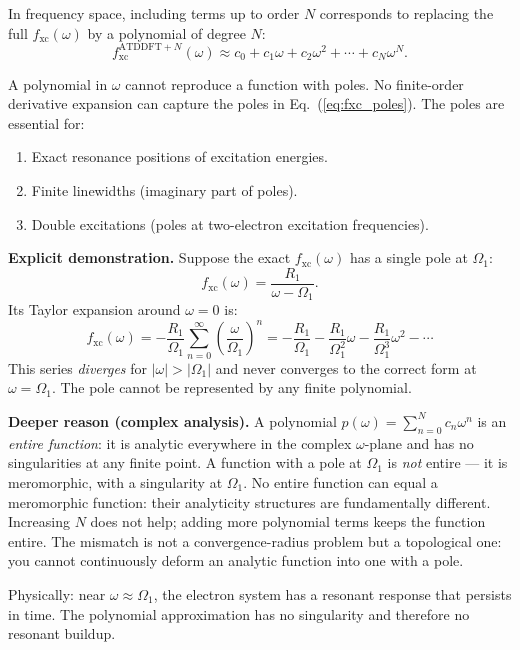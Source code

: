 \documentclass[12pt,letterpaper]{article}
\newcommand{\fxc}{f_{\mathrm{xc}}}
\theoremstyle{definition}
\begin{document}
In frequency space, including terms up to order $N$ corresponds to
replacing the full $\fxc(\omega)$ by a polynomial of degree $N$:
\begin{equation}
  \fxc^{\mathrm{ATDDFT}+N}(\omega)
  \approx c_0 + c_1\omega + c_2\omega^2 + \cdots + c_N\omega^N.
  \label{eq:polynomial}
\end{equation}

\begin{keyresult}
A polynomial in $\omega$ cannot reproduce a function with poles.
No finite-order derivative expansion can capture the poles in
Eq.~(\ref{eq:fxc_poles}).  The poles are essential for:
\begin{enumerate}[noitemsep]
  \item Exact resonance positions of excitation energies.
  \item Finite linewidths (imaginary part of poles).
  \item Double excitations (poles at two-electron excitation frequencies).
\end{enumerate}
\end{keyresult}

\begin{derivbox}
\textbf{Explicit demonstration.}
Suppose the exact $\fxc(\omega)$ has a single pole at $\Omega_1$:
\[
  \fxc(\omega) = \frac{R_1}{\omega - \Omega_1}.
\]
Its Taylor expansion around $\omega=0$ is:
\[
  \fxc(\omega) = -\frac{R_1}{\Omega_1}\sum_{n=0}^\infty
  \left(\frac{\omega}{\Omega_1}\right)^n
  = -\frac{R_1}{\Omega_1} - \frac{R_1}{\Omega_1^2}\omega
  - \frac{R_1}{\Omega_1^3}\omega^2 - \cdots
\]
This series \emph{diverges} for $|\omega|>|\Omega_1|$ and never
converges to the correct form at $\omega=\Omega_1$.  The pole cannot
be represented by any finite polynomial.

\textbf{Deeper reason (complex analysis).}
A polynomial $p(\omega) = \sum_{n=0}^N c_n\omega^n$ is an \emph{entire
function}: it is analytic everywhere in the complex $\omega$-plane and
has no singularities at any finite point.
A function with a pole at $\Omega_1$ is \emph{not} entire --- it is
meromorphic, with a singularity at $\Omega_1$.
No entire function can equal a meromorphic function:
their analyticity structures are fundamentally different.
Increasing $N$ does not help; adding more polynomial terms keeps the
function entire.  The mismatch is not a convergence-radius problem but
a topological one: you cannot continuously deform an analytic function
into one with a pole.

Physically: near $\omega \approx \Omega_1$, the electron system has a
resonant response that persists in time.  The polynomial approximation
has no singularity and therefore no resonant buildup.
\end{derivbox}
\end{document}
